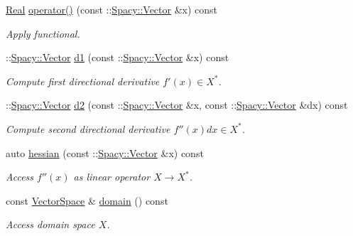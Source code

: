 \begin{DoxyCompactItemize}
\hyperlink{classSpacy_1_1Real}{Real} \hyperlink{classSpacy_1_1FEniCS_1_1C2Functional_abbf25dfc8e8c40edd3ac2dfb61030599}{operator()} (const \+::\hyperlink{classSpacy_1_1Vector}{Spacy\+::\+Vector} \&x) const 
\begin{DoxyCompactList}\small\item\em Apply functional. \end{DoxyCompactList}\item 
\+::\hyperlink{classSpacy_1_1Vector}{Spacy\+::\+Vector} \hyperlink{classSpacy_1_1FEniCS_1_1C2Functional_ab9b10dc982f81093c3125027b46c5876}{d1} (const \+::\hyperlink{classSpacy_1_1Vector}{Spacy\+::\+Vector} \&x) const 
\begin{DoxyCompactList}\small\item\em Compute first directional derivative $f'(x) \in X^* $. \end{DoxyCompactList}\item 
\+::\hyperlink{classSpacy_1_1Vector}{Spacy\+::\+Vector} \hyperlink{classSpacy_1_1FEniCS_1_1C2Functional_affc6728db99f20f57ce75f16799084b4}{d2} (const \+::\hyperlink{classSpacy_1_1Vector}{Spacy\+::\+Vector} \&x, const \+::\hyperlink{classSpacy_1_1Vector}{Spacy\+::\+Vector} \&dx) const 
\begin{DoxyCompactList}\small\item\em Compute second directional derivative $f''(x)dx\in X^* $. \end{DoxyCompactList}\item 
auto \hyperlink{classSpacy_1_1FEniCS_1_1C2Functional_aceec6783f701e121b35ffa482629e1dd}{hessian} (const \+::\hyperlink{classSpacy_1_1Vector}{Spacy\+::\+Vector} \&x) const 
\begin{DoxyCompactList}\small\item\em Access $f''(x)$ as linear operator $X\rightarrow X^*$. \end{DoxyCompactList}\item 
\hypertarget{classSpacy_1_1FunctionalBase_a2d3397deb9fa1ad85ed04e37a03b3aa6}{}const \hyperlink{classSpacy_1_1VectorSpace}{Vector\+Space} \& \hyperlink{classSpacy_1_1FunctionalBase_a2d3397deb9fa1ad85ed04e37a03b3aa6}{domain} () const \label{classSpacy_1_1FunctionalBase_a2d3397deb9fa1ad85ed04e37a03b3aa6}

\begin{DoxyCompactList}\small\item\em Access domain space $X$. \end{DoxyCompactList}\end{DoxyCompactItemize}


